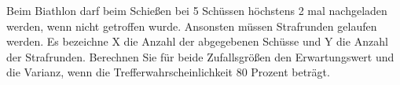 \documentclass[10pt, a4paper]{exam}
\begin{document}
\begin{questions}

    \question Beim Biathlon darf beim Schießen bei 5 Schüssen höchstens 2 mal nachgeladen werden, wenn nicht getroffen wurde. Ansonsten müssen Strafrunden gelaufen werden. Es bezeichne X die Anzahl der abgegebenen Schüsse und Y die Anzahl der Strafrunden. Berechnen Sie für beide Zufallsgrößen den Erwartungswert und die Varianz, wenn die Trefferwahrscheinlichkeit 80 Prozent beträgt.
    \begin{solution}
    \end{solution}


\end{questions}
\end{document}
